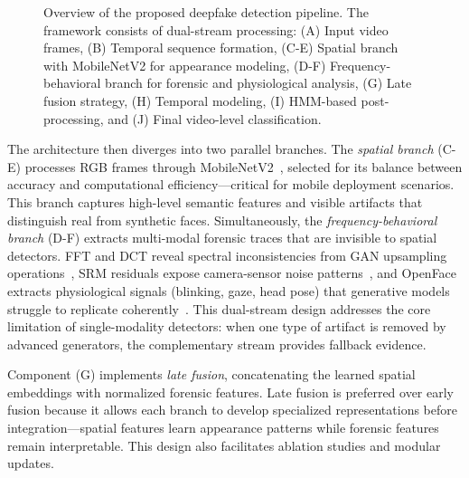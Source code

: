 \documentclass[conference]{IEEEtran}
\begin{document}
\begin{figure}[H]
\caption{Overview of the proposed deepfake detection pipeline. The framework consists of dual-stream processing: (A) Input video frames, (B) Temporal sequence formation, (C-E) Spatial branch with MobileNetV2 for appearance modeling, (D-F) Frequency-behavioral branch for forensic and physiological analysis, (G) Late fusion strategy, (H) Temporal modeling, (I) HMM-based post-processing, and (J) Final video-level classification.}
\label{fig:pipeline}
\end{figure}


The architecture then diverges into two parallel branches. The \textit{spatial branch} (C-E) processes RGB frames through MobileNetV2~\cite{b17}, selected for its balance between accuracy and computational efficiency—critical for mobile deployment scenarios. This branch captures high-level semantic features and visible artifacts that distinguish real from synthetic faces. Simultaneously, the \textit{frequency-behavioral branch} (D-F) extracts multi-modal forensic traces that are invisible to spatial detectors. FFT and DCT reveal spectral inconsistencies from GAN upsampling operations~\cite{b5,b9}, SRM residuals expose camera-sensor noise patterns~\cite{b19}, and OpenFace extracts physiological signals (blinking, gaze, head pose) that generative models struggle to replicate coherently~\cite{b10,b11,b18}. This dual-stream design addresses the core limitation of single-modality detectors: when one type of artifact is removed by advanced generators, the complementary stream provides fallback evidence.

Component (G) implements \textit{late fusion}, concatenating the learned spatial embeddings with normalized forensic features. Late fusion is preferred over early fusion because it allows each branch to develop specialized representations before integration—spatial features learn appearance patterns while forensic features remain interpretable. This design also facilitates ablation studies and modular updates.
\end{document}
